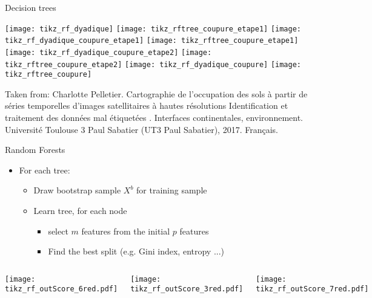   \begin{frame}{Decision trees}
    \begin{center}
      {				
        \texttt{[image: tikz\_rf\_dyadique]}
        \texttt{[image: tikz\_rftree\_coupure\_etape1]}
      }
      {				
        \texttt{[image: tikz\_rf\_dyadique\_coupure\_etape1]}
        \texttt{[image: tikz\_rftree\_coupure\_etape1]}
      }
      {
        \texttt{[image: tikz\_rf\_dyadique\_coupure\_etape2]}
        \texttt{[image: tikz\_rftree\_coupure\_etape2]}
      }
      {
        \texttt{[image: tikz\_rf\_dyadique\_coupure]}
        \texttt{[image: tikz\_rftree\_coupure]}
      }
    \end{center}
    {\tiny Taken from: Charlotte Pelletier. Cartographie de l’occupation des sols à partir de séries temporelles d’images satellitaires à hautes résolutions Identification et traitement des données mal étiquetées . Interfaces continentales, environnement. Université Toulouse 3 Paul Sabatier (UT3 Paul Sabatier), 2017. Français.}
  \end{frame}

  \begin{frame}{Random Forests}
    \begin{itemize}
    \item For each tree:
      \begin{itemize}
      \item Draw bootstrap sample $X^b$ for training sample
      \item Learn tree, for each node
        \begin{itemize}
        \item select $m$ features from the initial $p$ features
        \item Find the best split (e.g. Gini index, entropy ...)
        \end{itemize}
      \end{itemize}
    \end{itemize}
    
    \begin{columns}
      \texttt{[image: tikz\_rf\_outScore\_6red.pdf]}
      
      \texttt{[image: tikz\_rf\_outScore\_3red.pdf]}
      
      \texttt{[image: tikz\_rf\_outScore\_7red.pdf]}
    \end{columns}
  \end{frame}

